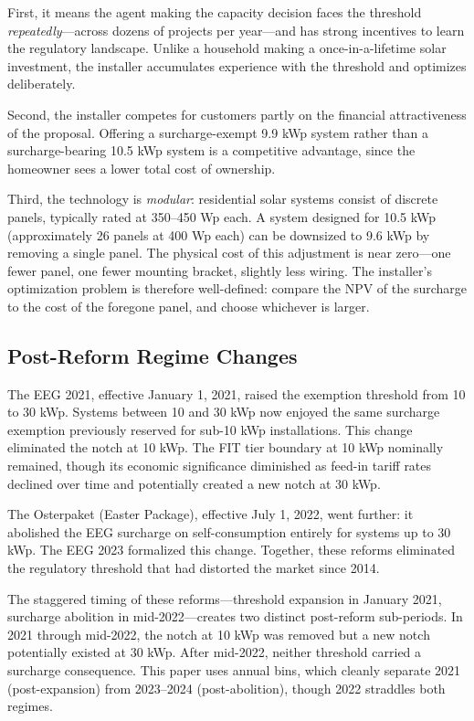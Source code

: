\documentclass[12pt]{article}
\begin{document}
First, it means the agent making the capacity decision faces the threshold \textit{repeatedly}---across dozens of projects per year---and has strong incentives to learn the regulatory landscape. Unlike a household making a once-in-a-lifetime solar investment, the installer accumulates experience with the threshold and optimizes deliberately.

Second, the installer competes for customers partly on the financial attractiveness of the proposal. Offering a surcharge-exempt 9.9 kWp system rather than a surcharge-bearing 10.5 kWp system is a competitive advantage, since the homeowner sees a lower total cost of ownership.

Third, the technology is \textit{modular}: residential solar systems consist of discrete panels, typically rated at 350--450 Wp each. A system designed for 10.5 kWp (approximately 26 panels at 400 Wp each) can be downsized to 9.6 kWp by removing a single panel. The physical cost of this adjustment is near zero---one fewer panel, one fewer mounting bracket, slightly less wiring. The installer's optimization problem is therefore well-defined: compare the NPV of the surcharge to the cost of the foregone panel, and choose whichever is larger.

\subsection{Post-Reform Regime Changes}

The EEG 2021, effective January 1, 2021, raised the exemption threshold from 10 to 30 kWp. Systems between 10 and 30 kWp now enjoyed the same surcharge exemption previously reserved for sub-10 kWp installations. This change eliminated the notch at 10 kWp. The FIT tier boundary at 10 kWp nominally remained, though its economic significance diminished as feed-in tariff rates declined over time and potentially created a new notch at 30 kWp.

The Osterpaket (Easter Package), effective July 1, 2022, went further: it abolished the EEG surcharge on self-consumption entirely for systems up to 30 kWp. The EEG 2023 formalized this change. Together, these reforms eliminated the regulatory threshold that had distorted the market since 2014.

The staggered timing of these reforms---threshold expansion in January 2021, surcharge abolition in mid-2022---creates two distinct post-reform sub-periods. In 2021 through mid-2022, the notch at 10 kWp was removed but a new notch potentially existed at 30 kWp. After mid-2022, neither threshold carried a surcharge consequence. This paper uses annual bins, which cleanly separate 2021 (post-expansion) from 2023--2024 (post-abolition), though 2022 straddles both regimes.
\end{document}
